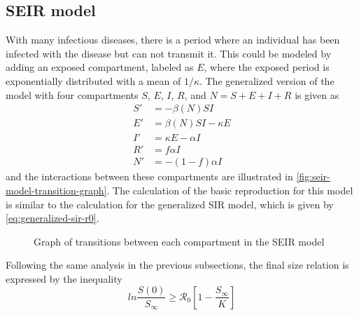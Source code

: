 \subsection{SEIR model}
\label{sec:literature-review-compartmental-seir-model}

With many infectious diseases, there is a period where an individual has been infected with the disease but can not transmit it.
This could be modeled by adding an exposed compartment, labeled as $E$, where the exposed period is exponentially distributed with a mean of $1 / \kappa$.
The generalized version of the model with four compartments $S$, $E$, $I$, $R$, and $N = S + E + I + R$ is given as \cite{brauerCompartmentalModelsEpidemiology2008}
\begin{equation}
    \begin{aligned}
        S' &= - \beta(N)SI \\
        E' &= \beta(N)SI - \kappa E \\
        I' &= \kappa E - \alpha I \\
        R' &= f \alpha I \\
        N' &= - (1 - f) \alpha I
    \end{aligned}
\end{equation}
and the interactions between these compartments are illustrated in \autoref{fig:seir-model-transition-graph}.
The calculation of the basic reproduction for this model is similar to the calculation for the generalized \gls{SIR} model, which is given by \autoref{eq:generalized-sir-r0}.

\begin{figure}
    \centering
    \caption{Graph of transitions between each compartment in the SEIR model}
    \label{fig:seir-model-transition-graph}
\end{figure}

Following the same analysis in the previous subsections, the final size relation is expressed by the inequality \cite{brauerCompartmentalModelsEpidemiology2008}
\begin{equation}
    ln \frac{S(0)}{S_\infty} \geq \mathcal{R}_0 \left[ 1 - \frac{S_\infty}{K} \right]
\end{equation}

